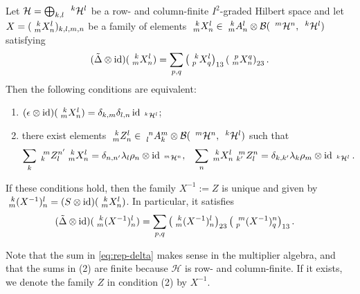 \begin{Lem} \label{lemma:rep-corep}
  Let $\mathcal{H}=\bigoplus_{k,l} \Gru{\mathcal{H}}{k}{l}$ be a row-
  and column-finite $I^{2}$-graded Hilbert space and let
  $X=(\Gr{X}{k}{l}{m}{n})_{k,l,m,n}$ be a family of elements
  $\Gr{X}{k}{l}{m}{n} \in \Gr{A}{k}{l}{m}{n} \otimes
  \mathcal{B}(\Gru{\mathcal{H}}{m}{n},\Gru{\mathcal{H}}{k}{l})$
  satisfying
  \begin{align} \label{eq:rep-delta}
    (\tilde \Delta \otimes \id)(\Gr{X}{k}{l}{m}{n}) = \sum_{p,q}
    \left(\Gr{X}{k}{l}{p}{q}\right)_{13}\left(\Gr{X}{p}{q}{m}{n}\right)_{23}. 
  \end{align}
  Then the following conditions are equivalent:
  \begin{enumerate}
  \item $(\epsilon \otimes
    \id)(\Gr{X}{k}{l}{m}{n})=\delta_{k,m}\delta_{l,n}\id_{\Gru{\mathcal{H}}{k}{l}}$;
  \item there exist elements $\Gr{Z}{k}{l}{m}{n} \in
    \Gr{A}{n}{m}{l}{k} \otimes
    \mathcal{B}(\Gru{\mathcal{H}}{m}{n},\Gru{\mathcal{H}}{k}{l})$ such
    that
  \begin{align*}
    \sum_{k} \Gr{Z}{m}{n'}{k}{l} \Gr{X}{k}{l}{m}{n} &= \delta_{n,n'}
    \lambda_{l} \rho_{n} \otimes \id_{\Gru{\mathcal{H}}{m}{n}}, &
    \sum_{n} \Gr{X}{k}{l}{m}{n} \Gr{Z}{m}{n}{k'}{l} &= \delta_{k,k'}
    \lambda_{k} \rho_{m} \otimes \id_{\Gru{\mathcal{H}}{k}{l}}.
  \end{align*}
  \end{enumerate}
  If these conditions hold, then the family $X^{-1}:=Z$ is unique and
  given by $\Gr{(X^{-1})}{k}{l}{m}{n}=(S \otimes
  \id)(\Gr{X}{k}{l}{m}{n})$. In particular, it satisfies
  \begin{align*}
    (\tilde \Delta \otimes \id)(\Gr{(X^{-1})}{k}{l}{m}{n}) &=
    \sum_{p,q}
    \left(\Gr{(X^{-1})}{k}{l}{m}{n}\right)_{23}\left(\Gr{(X^{-1})}{m}{n}{p}{q}\right)_{13}.
  \end{align*}
\end{Lem}
Note that the sum in \eqref{eq:rep-delta} makes sense in the
multiplier algebra, and that the sums in (2) are finite because
$\mathcal{H}$ is row- and column-finite. If it exists, we denote the family $Z$ in condition (2)  by $X^{-1}$.
